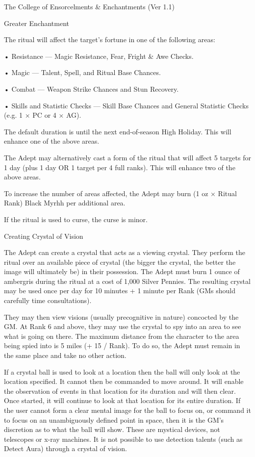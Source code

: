 \begin{Chapter}{The College of Ensorcelments \& Enchantments (Ver 1.1)}
\begin{ritual}[Q-1]{Greater Enchantment}
\begin{effects}
The ritual will affect the target’s fortune in one of 
the following areas:  

• Resistance — Magic Resistance, Fear, Fright \& Awe Checks.

• Magic — Talent, Spell, and Ritual Base Chances.

• Combat — Weapon Strike Chances and Stun Recovery.

• Skills and Statistic Checks — Skill Base Chances and General
Statistic Checks (e.g.  1 × PC or 4 × AG).

The default duration is until the next end-of-season High Holiday.
This will enhance one of the above areas.

The Adept may alternatively cast a form of the ritual that will affect
5 targets for 1 day (plus 1 day OR 1 target per 4 full ranks).  This
will enhance two of the above areas.

To increase the number of areas affected, the Adept may burn (1 oz ×
Ritual Rank) Black Myrhh per additional area.

If the ritual is used to curse, the curse is minor.
\end{effects}
\end{ritual}

\begin{ritual}[Q-2]{Creating Crystal of Vision}

\begin{effects}
The Adept can create a crystal that acts as a viewing crystal.  They
perform the ritual over an available piece of crystal (the bigger the
crystal, the better the image will ultimately be) in their possession.
The Adept must burn 1 ounce of ambergris during the ritual at a cost
of 1,000 Silver Pennies.  The resulting crystal may be used once per
day for 10 minutes + 1 minute per Rank (GMs should carefully time
consultations).

They may then view visions (usually precognitive in nature) concocted
by the GM.  At Rank 6 and above, they may use the crystal to spy into
an area to see what is going on there.  The maximum distance from the
character to the area being spied into is 5 miles (+ 15 / Rank). To do
so, the Adept must remain in the same place and take no other action.

If a crystal ball is used to look at a location then the ball will
only look at the location specified.  It cannot then be commanded to
move around. It will enable the observation of events in that location
for its duration and will then clear. Once started, it will continue
to look at that location for its entire duration.  If the user cannot
form a clear mental image for the ball to focus on, or command it to
focus on an unambiguously defined point in space, then it is the GM’s
discretion as to what the ball will show.  These are mystical devices,
not telescopes or x-ray machines. It is not possible to use detection
talents (such as Detect Aura) through a crystal of vision.
\end{effects}
\end{ritual}


\end{Chapter}
